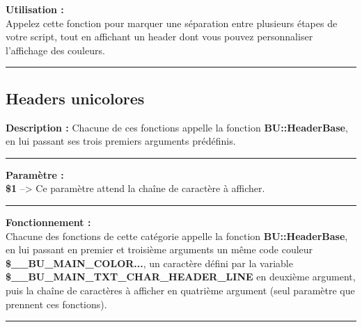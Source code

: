 \documentclass[a4paper,10pt]{article}
\begin{document}
\begin{justify}
    \textbf{Utilisation :}\\
    Appelez cette fonction pour marquer une séparation entre plusieurs étapes de votre script, tout en affichant un header dont vous pouvez personnaliser l'affichage des couleurs.
\end{justify}




\color{green}\par\noindent\rule{\textwidth}{0.4pt}\color{white}

\color{green}
\subsection{Headers unicolores}\color{white}

\begin{justify}
    \textbf{Description :}
    Chacune de ces fonctions appelle la fonction \textbf{\color{mauve}BU::HeaderBase}, en lui passant ses trois premiers arguments prédéfinis.
\end{justify}

\par\noindent\rule{\textwidth}{0.4pt}

\begin{justify}
    \textbf{Paramètre :}\\
    \textbf{\color{orange}\$1} --> Ce paramètre attend la chaîne de caractère à afficher.
\end{justify}

\par\noindent\rule{\textwidth}{0.4pt}

\begin{justify}
    \textbf{Fonctionnement :}\\
    Chacune des fonctions de cette catégorie appelle la fonction \textbf{\color{mauve}BU::HeaderBase}, en lui passant en premier et troisième arguments un même code couleur \textbf{\color{orange}\$\_\_BU\_MAIN\_COLOR...}, un caractère défini par la variable \textbf{\color{orange}\$\_\_BU\_MAIN\_TXT\_CHAR\_HEADER\_LINE} en deuxième argument, puis la chaîne de caractères à afficher en quatrième argument (seul paramètre que prennent ces fonctions).
\end{justify}

\par\noindent\rule{\textwidth}{0.4pt}
\end{document}

